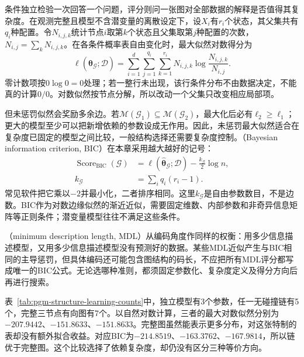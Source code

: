 条件独立检验一次回答一个问题，评分则问一张图对全部数据的解释是否值得其复杂度。在观测完整且模型不含潜变量的离散设定下，设$X_i$有$r_i$个状态，其父集共有$q_i$种配置。令$N_{i,j,k}$统计节点$i$取第$k$个状态且父集取第$j$种配置的次数，$N_{i,j}=\sum_kN_{i,j,k}$。在各条件概率表自由变化时，最大似然对数得分为
\begin{equation}
  \ell(\widehat{\bm{\theta}}_{\mathcal{G}};\mathcal{D})
  =\sum_{i=1}^{d}\sum_{j=1}^{q_i}\sum_{k=1}^{r_i}
    N_{i,j,k}\log\frac{N_{i,j,k}}{N_{i,j}}.
  \label{eq:pgm-structure-learning-local-likelihood}
\end{equation}
零计数项按$0\log0=0$处理；若一整行未出现，该行条件分布不由数据决定，不能真的计算$0/0$。对数似然按节点分解，所以改动一个父集只改变相应局部项。

但未惩罚似然会奖励多余边。若$\mathcal{M}(\mathcal{G}_1)\subseteq\mathcal{M}(\mathcal{G}_2)$，最大化后必有$\ell_2\geq\ell_1$；更大的模型至少可以把新增依赖的参数设成无作用。因此，未惩罚最大似然适合在复杂度已固定的模型之间比较，一般结构选择还需要复杂度控制。（Bayesian information criterion, BIC）在本章采用越大越好的记号：
\begin{equation}
  \begin{aligned}
    \operatorname{Score}_{\mathrm{BIC}}(\mathcal{G})
      &=\ell(\widehat{\bm{\theta}}_{\mathcal{G}};\mathcal{D})
        -\frac{k_{\mathcal{G}}}{2}\log n,\\
    k_{\mathcal{G}}&=\sum_iq_i(r_i-1).
  \end{aligned}
  \label{eq:pgm-structure-learning-bic}
\end{equation}
常见软件把它乘以$-2$并最小化，二者排序相同。这里$k_{\mathcal{G}}$是自由参数数目，不是边数。BIC作为对数边缘似然的渐近近似，需要固定维数、内部参数和非奇异信息矩阵等正则条件；潜变量模型往往不满足这些条件。

（minimum description length, MDL）从编码角度作同样的权衡：用多少信息描述模型，又用多少信息描述模型没有预测好的数据。某些MDL近似产生与BIC相同的主导惩罚，但具体编码还可能包含图结构的码长，不应把所有MDL评分都写成唯一的BIC公式。无论选哪种准则，都须固定参数化、复杂度定义及得分方向后再进行搜索。

表~\ref{tab:pgm-structure-learning-counts}中，独立模型有3个参数，任一无碰撞链有5个，完整三节点有向图有7个。以自然对数计算，三者的最大对数似然分别为$-207.9442$、$-151.8633$、$-151.8633$。完整图虽然能表示更多分布，对这张特制的表却没有额外拟合收益。对应BIC为$-214.8519$、$-163.3762$、$-167.9814$，所以链优于完整图。这个比较选择了依赖复杂度，却仍没有区分三种等价方向。

